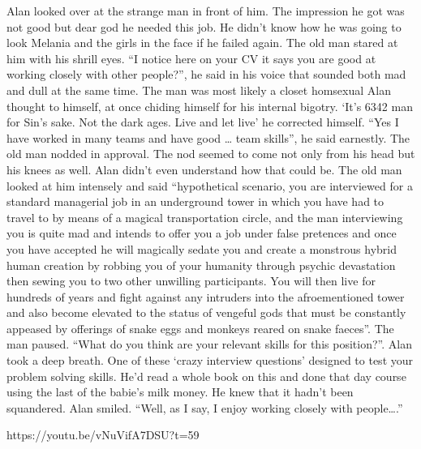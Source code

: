 \begin{multicols}{2}
Alan looked over at the strange man in front of him. The impression he got was not good but dear god he needed this job. He didn’t know how he was going to look Melania and the girls in the face if he failed again. The old man stared at him with his shrill eyes. “I notice here on your CV it says you are good at working closely with other people?”, he said in his voice that sounded both mad and dull at the same time. The man was most likely a closet homsexual Alan thought to himself, at once chiding himself for his internal bigotry. ‘It’s 6342 man for Sin’s sake. Not the dark ages. Live and let live’ he corrected himself. “Yes I have worked in many teams and have good … team skills”, he said earnestly. The old man nodded in approval. The nod seemed to come not only from his head but his knees as well. Alan didn’t even understand how that could be. The old man looked at him intensely and said “hypothetical scenario, you are interviewed for a standard managerial job in an underground tower in which you have had to travel to by means of a magical transportation circle, and the man interviewing you is quite mad and intends to offer you a job under false pretences and once you have accepted he will magically sedate you and create a monstrous hybrid human creation by robbing you of your humanity through psychic devastation then sewing you to two other unwilling participants. You will then live for hundreds of years and fight against any intruders into the afroementioned tower and also become elevated to the status of vengeful gods that must be constantly appeased by offerings of snake eggs and monkeys reared on snake faeces”. The man paused. “What do you think are your relevant skills for this position?”. Alan took a deep breath. One of these ‘crazy interview questions’ designed to test your problem solving skills. He’d read a whole book on this and done that day course using the last of the babie’s milk money. He knew that it hadn’t been squandered. Alan smiled. “Well, as I say, I enjoy working closely with people….”\medskip

https://youtu.be/vNuVifA7DSU?t=59

\end{multicols}

\vspace*{5mm}

